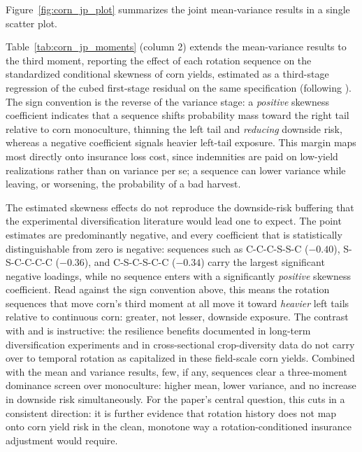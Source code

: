 \documentclass[12pt,letterpaper]{article}
\theoremstyle{remark}
\theoremstyle{remark}
\theoremstyle{plain}
\theoremstyle{definition}
\begin{document}
Figure~\ref{fig:corn_jp_plot} summarizes the joint mean-variance results in a single scatter plot.

Table~\ref{tab:corn_jp_moments} (column 2) extends the mean-variance results to the third moment, reporting the effect of each rotation sequence on the standardized conditional skewness of corn yields, estimated as a third-stage regression of the cubed first-stage residual on the same specification (following \citet{antle1983}). The sign convention is the reverse of the variance stage: a \emph{positive} skewness coefficient indicates that a sequence shifts probability mass toward the right tail relative to corn monoculture, thinning the left tail and \emph{reducing} downside risk, whereas a negative coefficient signals heavier left-tail exposure. This margin maps most directly onto insurance loss cost, since indemnities are paid on low-yield realizations rather than on variance per se; a sequence can lower variance while leaving, or worsening, the probability of a bad harvest.

The estimated skewness effects do not reproduce the downside-risk buffering that the experimental diversification literature would lead one to expect. The point estimates are predominantly negative, and every coefficient that is statistically distinguishable from zero is negative: sequences such as C-C-C-S-S-C ($-0.40$), S-S-C-C-C-C ($-0.36$), and C-S-C-S-C-C ($-0.34$) carry the largest significant negative loadings, while no sequence enters with a significantly \emph{positive} skewness coefficient. Read against the sign convention above, this means the rotation sequences that move corn's third moment at all move it toward \emph{heavier} left tails relative to continuous corn: greater, not lesser, downside exposure. The contrast with \citet{bowles2020} and \citet{difalco2009} is instructive: the resilience benefits documented in long-term diversification experiments and in cross-sectional crop-diversity data do not carry over to temporal rotation as capitalized in these field-scale corn yields. Combined with the mean and variance results, few, if any, sequences clear a three-moment dominance screen over monoculture: higher mean, lower variance, and no increase in downside risk simultaneously. For the paper's central question, this cuts in a consistent direction: it is further evidence that rotation history does not map onto corn yield risk in the clean, monotone way a rotation-conditioned insurance adjustment would require.
\end{document}
